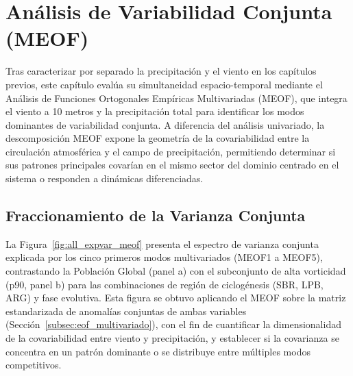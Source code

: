 \chapter{Análisis de Variabilidad Conjunta (MEOF)}
\label{chap:meof}

Tras caracterizar por separado la precipitación y el viento en los capítulos previos, este capítulo evalúa su simultaneidad espacio-temporal mediante el Análisis de Funciones Ortogonales Empíricas Multivariadas (MEOF), que integra el viento a 10 metros y la precipitación total para identificar los modos dominantes de variabilidad conjunta.
A diferencia del análisis univariado, la descomposición MEOF expone la geometría de la covariabilidad entre la circulación atmosférica y el campo de precipitación, permitiendo determinar si sus patrones principales covarían en el mismo sector del dominio centrado en el sistema o responden a dinámicas diferenciadas.

\section{Fraccionamiento de la Varianza Conjunta}
\label{sec:meof_varianza}

La Figura~\ref{fig:all_expvar_meof} presenta el espectro de varianza conjunta explicada por los cinco primeros modos multivariados (MEOF1 a MEOF5), contrastando la Población Global (panel a) con el subconjunto de alta vorticidad (p90, panel b) para las combinaciones de región de ciclogénesis (SBR, LPB, ARG) y fase evolutiva.
Esta figura se obtuvo aplicando el MEOF sobre la matriz estandarizada de anomalías conjuntas de ambas variables (Sección~\ref{subsec:eof_multivariado}), con el fin de cuantificar la dimensionalidad de la covariabilidad entre viento y precipitación, y establecer si la covarianza se concentra en un patrón dominante o se distribuye entre múltiples modos competitivos.

